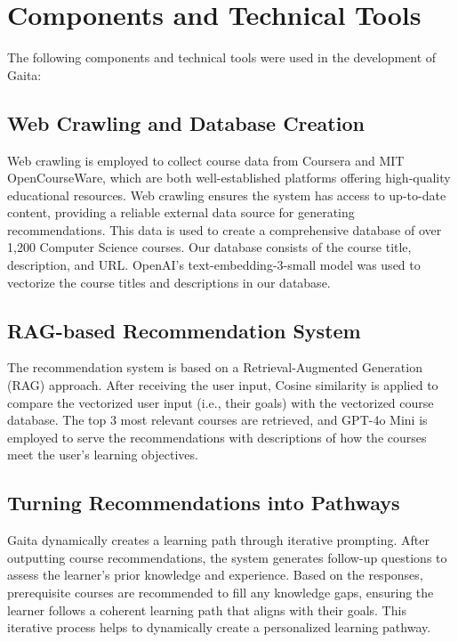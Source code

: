 \section{Components and Technical Tools}

The following components and technical tools were used in the development of Gaita: 

\subsection{Web Crawling and Database Creation}

Web crawling is employed to collect course data from Coursera and MIT OpenCourseWare, which are both well-established platforms offering high-quality educational resources. Web crawling ensures the system has access to up-to-date content, providing a reliable external data source for generating recommendations. This data is used to create a comprehensive database of over 1,200 Computer Science courses. Our database consists of the course title, description, and URL. OpenAI’s text-embedding-3-small model was used to vectorize the course titles and descriptions in our database. 

\subsection{RAG-based Recommendation System}

The recommendation system is based on a Retrieval-Augmented Generation (RAG) approach. After receiving the user input, Cosine similarity is applied to compare the vectorized user input (i.e., their goals) with the vectorized course database. The top 3 most relevant courses are retrieved, and GPT-4o Mini is employed to serve the recommendations with descriptions of how the courses meet the user’s learning objectives.

\subsection{Turning Recommendations into Pathways}

Gaita dynamically creates a learning path through iterative prompting. After outputting course recommendations, the system generates follow-up questions to assess the learner's prior knowledge and experience. Based on the responses, prerequisite courses are recommended to fill any knowledge gaps, ensuring the learner follows a coherent learning path that aligns with their goals. This iterative process helps to dynamically create a personalized learning pathway.




